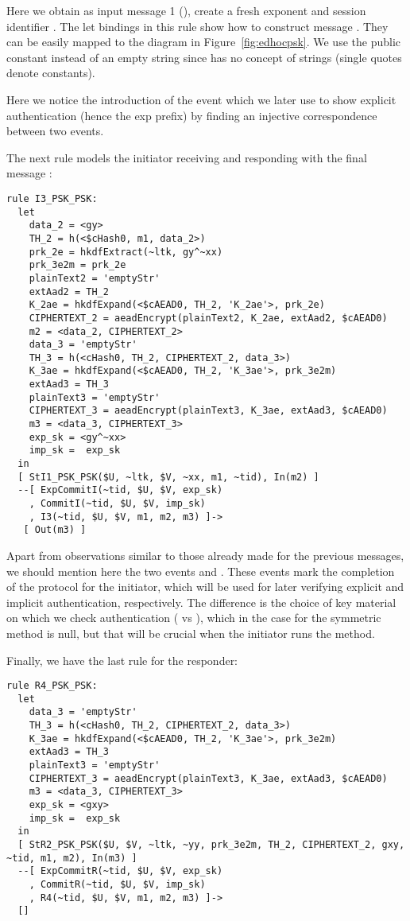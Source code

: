 Here we obtain as input message 1 (), create a fresh exponent  and
session identifier .  The let bindings in this rule show how to
construct message .  They can be easily mapped to the diagram in
Figure~\ref{fig:edhocpsk}.  We use the public constant  instead
of an empty string since \mTamarin{} has no concept of strings (single quotes
denote constants).

Here we notice the introduction of the event 
% 
which we later use to show explicit authentication (hence the exp prefix) by
finding an injective correspondence between two events.

The next rule models the initiator receiving  and responding with the
final message :
\begin{lstlisting}
rule I3_PSK_PSK:
  let
    data_2 = <gy> 
    TH_2 = h(<$cHash0, m1, data_2>)
    prk_2e = hkdfExtract(~ltk, gy^~xx)
    prk_3e2m = prk_2e
    plainText2 = 'emptyStr' 
    extAad2 = TH_2
    K_2ae = hkdfExpand(<$cAEAD0, TH_2, 'K_2ae'>, prk_2e)
    CIPHERTEXT_2 = aeadEncrypt(plainText2, K_2ae, extAad2, $cAEAD0)
    m2 = <data_2, CIPHERTEXT_2>
    data_3 = 'emptyStr' 
    TH_3 = h(<cHash0, TH_2, CIPHERTEXT_2, data_3>)
    K_3ae = hkdfExpand(<$cAEAD0, TH_2, 'K_3ae'>, prk_3e2m)
    extAad3 = TH_3
    plainText3 = 'emptyStr'
    CIPHERTEXT_3 = aeadEncrypt(plainText3, K_3ae, extAad3, $cAEAD0)
    m3 = <data_3, CIPHERTEXT_3>
    exp_sk = <gy^~xx>
    imp_sk =  exp_sk
  in
  [ StI1_PSK_PSK($U, ~ltk, $V, ~xx, m1, ~tid), In(m2) ]
  --[ ExpCommitI(~tid, $U, $V, exp_sk)
    , CommitI(~tid, $U, $V, imp_sk)
    , I3(~tid, $U, $V, m1, m2, m3) ]->
   [ Out(m3) ]
\end{lstlisting}

Apart from observations similar to those already made for the previous messages,
we should mention here the two events %
 and . %
These events mark the completion of the protocol for the initiator, which will
be used for later verifying explicit and implicit authentication, respectively.
The difference is the choice of key material on which we check authentication
( vs ), which in the case for the symmetric method is
null, but that will be crucial when the initiator runs the \mStat method.

Finally, we have the last rule for the responder:
\begin{lstlisting}
rule R4_PSK_PSK:
  let
    data_3 = 'emptyStr' 
    TH_3 = h(<cHash0, TH_2, CIPHERTEXT_2, data_3>)
    K_3ae = hkdfExpand(<$cAEAD0, TH_2, 'K_3ae'>, prk_3e2m)
    extAad3 = TH_3
    plainText3 = 'emptyStr'
    CIPHERTEXT_3 = aeadEncrypt(plainText3, K_3ae, extAad3, $cAEAD0)
    m3 = <data_3, CIPHERTEXT_3>
    exp_sk = <gxy>
    imp_sk =  exp_sk
  in
  [ StR2_PSK_PSK($U, $V, ~ltk, ~yy, prk_3e2m, TH_2, CIPHERTEXT_2, gxy, ~tid, m1, m2), In(m3) ]
  --[ ExpCommitR(~tid, $U, $V, exp_sk)
    , CommitR(~tid, $U, $V, imp_sk)
    , R4(~tid, $U, $V, m1, m2, m3) ]->
  []
\end{lstlisting}

